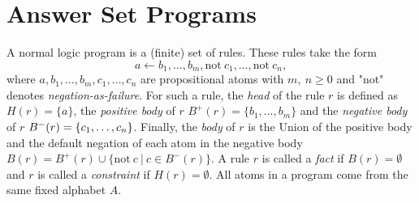 \section{Answer Set Programs}
\label{sec:Preliminaries on answer set programming/Answer Set Programs}

A normal logic program is a (finite) set of rules. These rules take the form
\[
    a \leftarrow b_1, \ldots , b_m, \text{not}\ c_1, \ldots , \text{not}\ c_n,
\]
where \(a, b_1, \ldots , b_m, c_1, \ldots ,c_n\) are propositional atoms with \(m,\ n \geq 0\) and "not" denotes \emph{negation-as-failure}. For such a rule, the \emph{head} of the rule $r$ is defined as \(H(r) = \{a\}\), the \emph{positive body} of $r$ \(B^+(r) = \{ b_1, \ldots , b_m\}\) and the \emph{negative body} of $r$ \(B^-(r) = \nolinebreak \{c_1, \ldots ,c_n\}\). Finally, the \emph{body} of $r$ is the Union of the positive body and the default negation of each atom in the negative body \(B(r) = B^+(r) \cup \{\text{not}\ c\ |\ c \in B^-(r)\}\). A rule $r$ is called a \emph{fact} if \(B(r) = \emptyset\) and $r$ is called a \emph{constraint} if \(H(r) = \emptyset\).
All atoms in a program come from the same fixed alphabet $A$.

